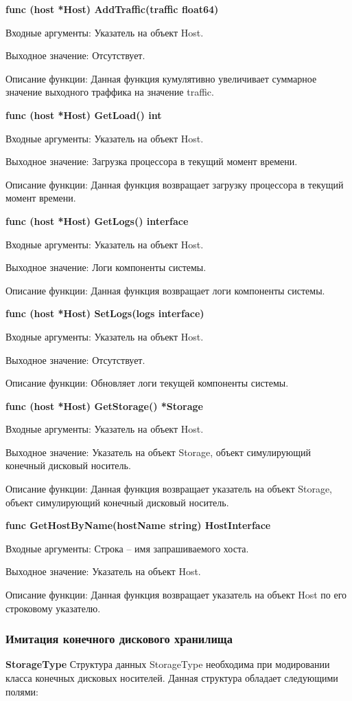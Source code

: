 \textbf{func (host *Host) AddTraffic(traffic float64)}

Входные аргументы: Указатель на объект Host.

Выходное значение: Отсутствует.

Описание функции: Данная функция кумулятивно увеличивает суммарное значение выходного траффика на значение traffic. 


\textbf{func (host *Host) GetLoad() int }

Входные аргументы: Указатель на объект Host.

Выходное значение: Загрузка процессора в текущий момент времени.

Описание функции: Данная функция возвращает загрузку процессора в текущий момент времени.


\textbf{func (host *Host) GetLogs() interface}

Входные аргументы: Указатель на объект Host.

Выходное значение: Логи компоненты системы. 

Описание функции: Данная функция возвращает логи компоненты системы. 


\textbf{func (host *Host) SetLogs(logs interface)}

Входные аргументы: Указатель на объект Host.

Выходное значение: Отсутствует.

Описание функции: Обновляет логи текущей компоненты системы. 


\textbf{func (host *Host) GetStorage() *Storage }

Входные аргументы: Указатель на объект Host.

Выходное значение: Указатель на объект Storage, объект симулирующий конечный дисковый носитель.

Описание функции: Данная функция возвращает указатель на объект Storage, объект симулирующий конечный дисковый носитель.


\textbf{func GetHostByName(hostName string) HostInterface }

Входные аргументы: Строка -- имя запрашиваемого хоста. 

Выходное значение: Указатель на объект Host.

Описание функции: Данная функция возвращает указатель на объект Host по его строковому указателю.

\subsubsection{Имитация конечного дискового хранилища}
\textbf{StorageType}
Структура данных StorageType необходима при модировании класса конечных дисковых носителей. Данная структура обладает следующими полями:

